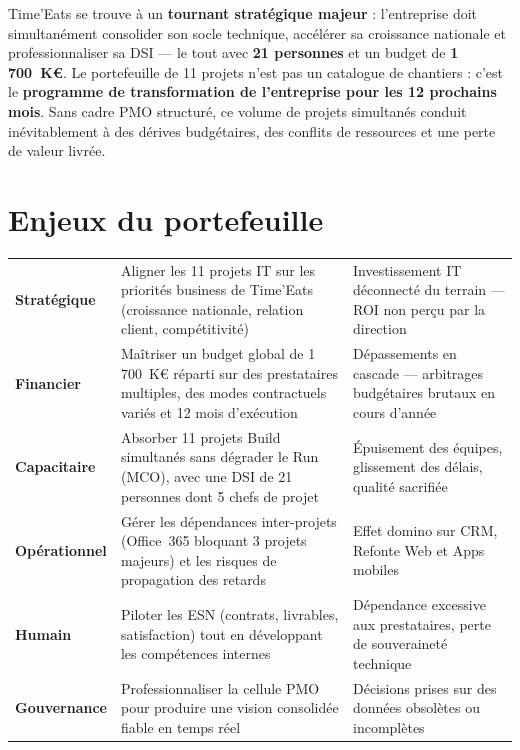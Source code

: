 \documentclass[11pt,a4paper,oneside]{report}
\begin{document}
Time'Eats se trouve à un \textbf{tournant stratégique majeur} : l'entreprise doit simultanément consolider son socle technique, accélérer sa croissance nationale et professionnaliser sa DSI --- le tout avec \textbf{21 personnes} et un budget de \textbf{1\,700~K€}. Le portefeuille de 11 projets n'est pas un catalogue de chantiers : c'est le \textbf{programme de transformation de l'entreprise pour les 12 prochains mois}. Sans cadre PMO structuré, ce volume de projets simultanés conduit inévitablement à des dérives budgétaires, des conflits de ressources et une perte de valeur livrée.

\section{Enjeux du portefeuille}

\vspace{4pt}
\begin{center}
\renewcommand{\arraystretch}{1.6}
\begin{tabularx}{\textwidth}{C{2.5cm} L{5.5cm} L{6cm}}
\toprule
{}
 &  &  \\
\midrule
\textbf{Stratégique} & Aligner les 11 projets IT sur les priorités business de Time'Eats (croissance nationale, relation client, compétitivité) & Investissement IT déconnecté du terrain --- ROI non perçu par la direction \\
\textbf{Financier} & Maîtriser un budget global de 1\,700~K€ réparti sur des prestataires multiples, des modes contractuels variés et 12 mois d'exécution & Dépassements en cascade --- arbitrages budgétaires brutaux en cours d'année \\
\textbf{Capacitaire} & Absorber 11 projets Build simultanés sans dégrader le Run (MCO), avec une DSI de 21 personnes dont 5 chefs de projet & Épuisement des équipes, glissement des délais, qualité sacrifiée \\
\textbf{Opérationnel} & Gérer les dépendances inter-projets (Office~365 bloquant 3 projets majeurs) et les risques de propagation des retards & Effet domino sur CRM, Refonte Web et Apps mobiles \\
\textbf{Humain} & Piloter les ESN (contrats, livrables, satisfaction) tout en développant les compétences internes & Dépendance excessive aux prestataires, perte de souveraineté technique \\
\textbf{Gouvernance} & Professionnaliser la cellule PMO pour produire une vision consolidée fiable en temps réel & Décisions prises sur des données obsolètes ou incomplètes \\
\bottomrule
\end{tabularx}
\end{center}
\end{document}
